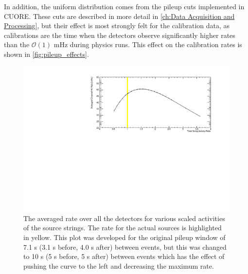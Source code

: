 In addition, the uniform distribution comes from the pileup cuts implemented in CUORE.
These cuts are described in more detail in \autoref{ch:Data Acquisition and Processing}, but their effect is most strongly felt for the calibration data, as calibrations are the time when the detectors observe significantly higher rates than the $\mathcal{O}(1)$ mHz during physics runs.
This effect on the calibration rates is shown in \autoref{fig:pileup_effects}.
\begin{figure}
    \centering
    \includegraphics[width=0.9\linewidth]{Figures/HitRate_Activity.pdf}
    \caption[The averaged rate over all the detectors for various scaled activities of the source strings.]
    {The averaged rate over all the detectors for various scaled activities of the source strings.
    The rate for the actual sources is highlighted in yellow.
    This plot was developed for the original pileup window of 7.1 s (3.1 s before, 4.0 s after) between events, but this was changed to 10 s (5 s before, 5 s after) between events which has the effect of pushing the curve to the left and decreasing the maximum rate.}
    \label{fig:pileup_effects}
\end{figure}

